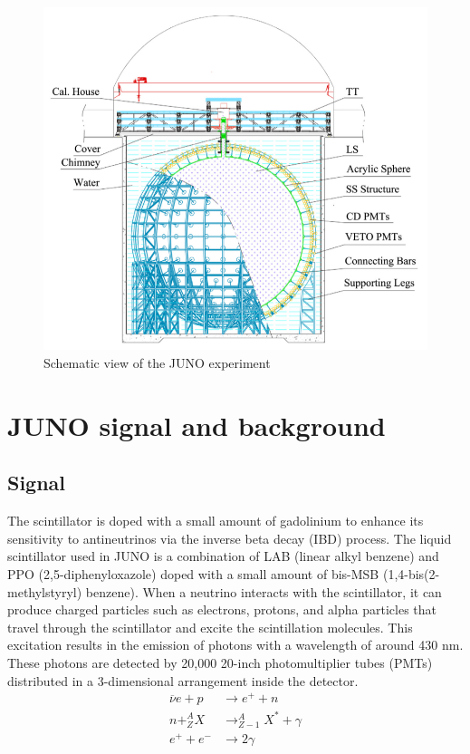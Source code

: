 \begin{figure}[h]
	\centering
	\includegraphics[width=0.7\linewidth]{Images/juno_scheme_experiment}
	\caption[JUNO scheme experiment]{Schematic view of the JUNO experiment}
	\label{fig:junoschemeexperiment}
\end{figure}


\section{JUNO signal and background}
\subsection{Signal}
The scintillator is doped with a small amount of gadolinium to enhance its sensitivity to antineutrinos via the inverse beta decay (IBD) process. The liquid scintillator used in JUNO is a combination of LAB (linear alkyl benzene) and PPO (2,5-diphenyloxazole) doped with a small amount of bis-MSB (1,4-bis(2-methylstyryl) benzene). When a neutrino interacts with the scintillator, it can produce charged particles such as electrons, protons, and alpha particles that travel through the scintillator and excite the scintillation molecules. This excitation results in the emission of photons with a wavelength of around 430 nm. These photons are detected by 20,000 20-inch photomultiplier tubes (PMTs) distributed in a 3-dimensional arrangement inside the detector.\\




\begin{equation}
	\begin{aligned}
		\overline{\nu}e + p &\rightarrow e^+ + n \\
		n + ^A_ZX &\rightarrow ^{A}_{Z-1}X^* + \gamma \\
		e^+ + e^- &\rightarrow 2\gamma
	\end{aligned}
\end{equation} 

